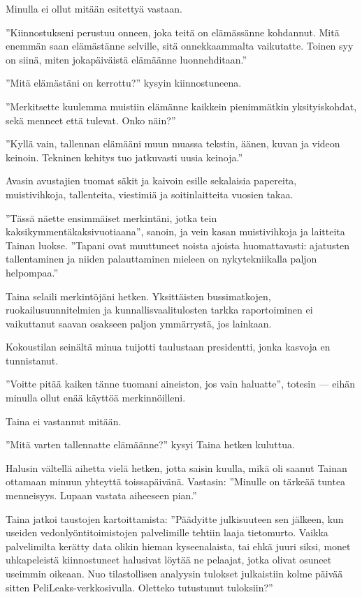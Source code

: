 ﻿\documentclass[a4paper, 12pt, finnish]{article}
\newcommand{\q}[1]{''#1''}
\begin{document}
Minulla ei ollut mitään esitettyä vastaan.

\q{Kiinnostukseni perustuu onneen, joka teitä on elämässänne kohdannut.
Mitä enemmän saan elämästänne selville, sitä onnekkaammalta vaikutatte.
Toinen syy on siinä, miten jokapäiväistä elämäänne luonnehditaan.}

\q{Mitä elämästäni on kerrottu?} kysyin kiinnostuneena.

\q{Merkitsette kuulemma muistiin elämänne kaikkein pienimmätkin
yksityiskohdat, sekä menneet että tulevat. Onko näin?}

\q{Kyllä vain, tallennan elämääni muun muassa tekstin, äänen,
kuvan ja videon keinoin. Tekninen kehitys tuo jatkuvasti
uusia keinoja.}

Avasin avustajien tuomat säkit ja kaivoin esille sekalaisia
papereita, muistivihkoja, tallenteita, viestimiä
ja soitinlaitteita vuosien takaa.

\q{Tässä näette ensimmäiset merkintäni, jotka tein kaksikymmentäkaksivuotiaana},
sanoin, ja vein kasan muistivihkoja ja laitteita Tainan
luokse. \q{Tapani ovat muuttuneet noista ajoista huomattavasti:
ajatusten tallentaminen ja niiden palauttaminen mieleen on
nykytekniikalla paljon helpompaa.}

Taina selaili merkintöjäni hetken. Yksittäisten bussimatkojen,
ruokailusuunnitelmien ja kunnallisvaalitulosten tarkka raportoiminen
ei vaikuttanut saavan osakseen paljon ymmärrystä, jos lainkaan.

Kokoustilan seinältä minua tuijotti taulustaan presidentti,
jonka kasvoja en tunnistanut.

\q{Voitte pitää kaiken tänne
tuomani aineiston, jos vain haluatte}, totesin --- eihän minulla
ollut enää käyttöä merkinnöilleni.

Taina ei vastannut mitään.

\q{Mitä varten tallennatte elämäänne?} kysyi Taina hetken kuluttua.

Halusin vältellä aihetta vielä hetken, jotta saisin kuulla,
mikä oli saanut Tainan ottamaan minuun yhteyttä
toissapäivänä. Vastasin: \q{Minulle on tärkeää tuntea menneisyys.
Lupaan vastata aiheeseen pian.}

Taina jatkoi taustojen kartoittamista: \q{Päädyitte julkisuuteen
sen jälkeen, kun useiden vedonlyöntitoimistojen palvelimille
tehtiin laaja tietomurto. Vaikka palvelimilta kerätty data olikin
hieman kyseenalaista, tai ehkä juuri siksi, monet uhkapeleistä
kiinnostuneet halusivat löytää ne pelaajat, jotka olivat osuneet
useimmin oikeaan.
Nuo tilastollisen analyysin tulokset julkaistiin kolme päivää
sitten PeliLeaks-verkkosivulla. Oletteko tutustunut tuloksiin?}
\end{document}
